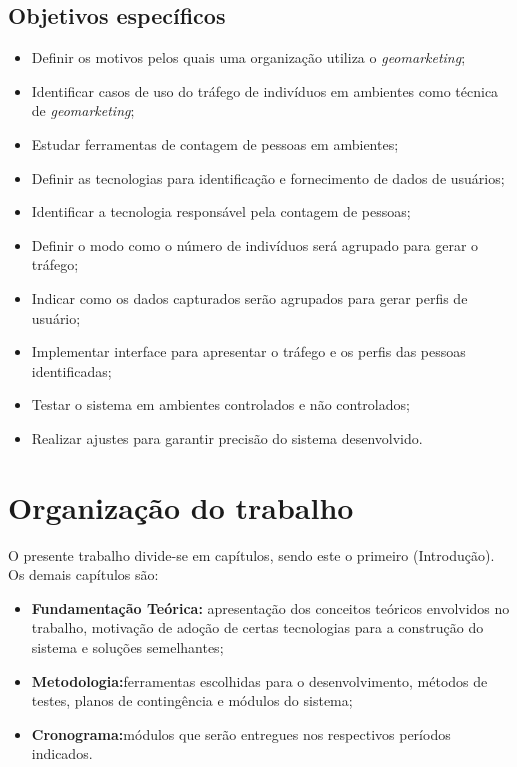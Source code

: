 \subsection{Objetivos específicos}
\begin{itemize}
  \item Definir os motivos pelos quais uma organização utiliza o \emph{geomarketing};
  \item Identificar casos de uso do tráfego de indivíduos em ambientes como técnica
  de \emph{geomarketing};
  \item Estudar ferramentas de contagem de pessoas em ambientes;
  \item Definir as tecnologias para identificação e fornecimento de dados de usuários;
  \item Identificar a tecnologia responsável pela contagem de pessoas;
  \item Definir o modo como o número de indivíduos será agrupado para gerar o tráfego;
  \item Indicar como os dados capturados serão agrupados para gerar perfis de usuário;
  \item Implementar interface para apresentar o tráfego e os perfis das pessoas identificadas;
  \item Testar o sistema em ambientes controlados e não controlados;
  \item Realizar ajustes para garantir precisão do sistema desenvolvido.
\end{itemize}

\section{Organização do trabalho}
O presente trabalho divide-se em capítulos, sendo este o primeiro (Introdução). Os demais capítulos são:

\begin{itemize}
  \item \textbf{Fundamentação Teórica:} apresentação dos conceitos teóricos envolvidos no trabalho, motivação de
  adoção de certas tecnologias para a construção do sistema e soluções semelhantes;
  \item \textbf{Metodologia:}ferramentas escolhidas para o desenvolvimento, métodos de testes, planos de contingência e módulos
  do sistema;
  \item \textbf{Cronograma:}módulos que serão entregues nos respectivos períodos indicados.
\end{itemize}

